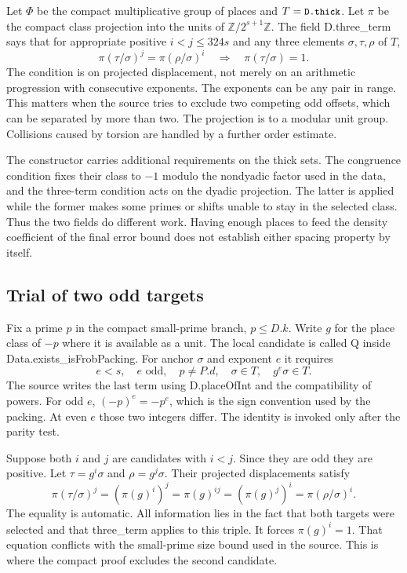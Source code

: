 \documentclass[12pt,letterpaper]{article}
\DeclareRobustCommand{\id}[1]{\mbox{\small\ttfamily #1}}
\begin{document}
Let $\Phi$ be the compact multiplicative group of places and $T=\id{D.thick}$. Let $\pi$ be the compact class projection into the units of \(\mathbb Z/2^{s+1}\mathbb Z\). The field \id{D.three\_term} says that for appropriate positive $i<j\le324s$ and any three elements $\sigma,\tau,\rho$ of $T$,
\[
     \pi(\tau/\sigma)^j=\pi(\rho/\sigma)^i
                  \quad\Longrightarrow\quad \pi(\tau/\sigma)=1 .
\]
The condition is on projected displacement, not merely on an arithmetic progression with consecutive exponents. The exponents can be any pair in range. This matters when the source tries to exclude two competing odd offsets, which can be separated by more than two. The projection is to a modular unit group. Collisions caused by torsion are handled by a further order estimate.

The constructor carries additional requirements on the thick sets. The congruence condition fixes their class to $-1$ modulo the nondyadic factor used in the data, and the three-term condition acts on the dyadic projection. The latter is applied while the former makes some primes or shifts unable to stay in the selected class. Thus the two fields do different work. Having enough places to feed the density coefficient of the final error bound does not establish either spacing property by itself.

\subsection{Trial of two odd targets}

Fix a prime $p$ in the compact small-prime branch, $p\le D.k$. Write $g$ for the place class of $-p$ where it is available as a unit. The local candidate is called \id{Q} inside \id{Data.exists\_isFrobPacking}. For anchor $\sigma$ and exponent $e$ it requires
\[
  e<s,\quad e\text{ odd},\quad p\ne P.d,\quad
  \sigma\in T,\quad g^e\sigma\in T .
\]
The source writes the last term using \id{D.placeOfInt} and the compatibility of powers. For odd $e$, \( (-p)^e=-p^e\), which is the sign convention used by the packing. At even $e$ those two integers differ. The identity is invoked only after the parity test.

Suppose both $i$ and $j$ are candidates with $i<j$. Since they are odd they are positive. Let $\tau=g^i\sigma$ and $\rho=g^j\sigma$. Their projected displacements satisfy
\[
 \pi(\tau/\sigma)^j=(\pi(g)^i)^j=\pi(g)^{ij}
                              =(\pi(g)^j)^i=\pi(\rho/\sigma)^i .
\]
The equality is automatic. All information lies in the fact that both targets were selected and that \id{three\_term} applies to this triple. It forces $\pi(g)^i=1$. That equation conflicts with the small-prime size bound used in the source. This is where the compact proof excludes the second candidate.
\end{document}
